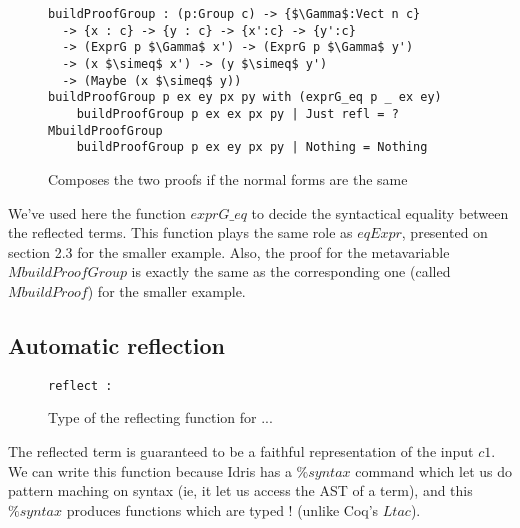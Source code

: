 \begin{figure}[H]
\figrule
\begin{center}
\begin{lstlisting}
buildProofGroup : (p:Group c) -> {$\Gamma$:Vect n c} 
  -> {x : c} -> {y : c} -> {x':c} -> {y':c} 
  -> (ExprG p $\Gamma$ x') -> (ExprG p $\Gamma$ y') 
  -> (x $\simeq$ x') -> (y $\simeq$ y') 
  -> (Maybe (x $\simeq$ y))
buildProofGroup p ex ey px py with (exprG_eq p _ ex ey)
    buildProofGroup p ex ex px py | Just refl = ?MbuildProofGroup
    buildProofGroup p ex ey px py | Nothing = Nothing
\end{lstlisting}
\end{center}
\caption{Composes the two proofs if the normal forms are the same}
\figrule
\end{figure}
We've used here the function $exprG\_eq$ to decide the syntactical equality between the reflected terms. This function plays the same role as $eqExpr$, presented on section 2.3 for the smaller example. Also, the proof for the metavariable $MbuildProofGroup$ is exactly the same as the corresponding one (called $MbuildProof$) for the smaller example.


\subsection {Automatic reflection}

\begin{figure}[H]
\figrule
\begin{center}
\begin{lstlisting}
reflect : 
\end{lstlisting}
\end{center}
\caption{Type of the reflecting function for ...}
\figrule
\end{figure}

The reflected term is guaranteed to be a faithful representation of the input $c1$. We can write this function because Idris has a $\%syntax$ command which let us do pattern maching on syntax (ie, it let us access the AST of a term), and this $\%syntax$ produces functions which are typed ! (unlike Coq's $Ltac$). 









